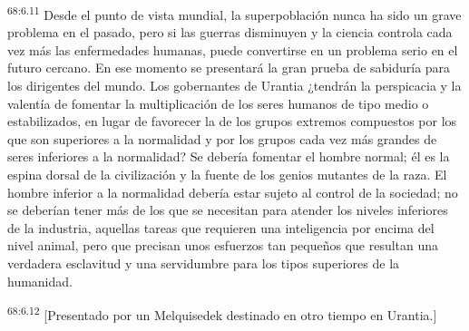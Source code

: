 \par
\textsuperscript{68:6.11} Desde el punto de vista mundial, la superpoblación nunca ha sido un grave problema en el pasado, pero si las guerras disminuyen y la ciencia controla cada vez más las enfermedades humanas, puede convertirse en un problema serio en el futuro cercano. En ese momento se presentará la gran prueba de sabiduría para los dirigentes del mundo. Los gobernantes de Urantia ¿tendrán la perspicacia y la valentía de fomentar la multiplicación de los seres humanos de tipo medio o estabilizados, en lugar de favorecer la de los grupos extremos compuestos por los que son superiores a la normalidad y por los grupos cada vez más grandes de seres inferiores a la normalidad? Se debería fomentar el hombre normal; él es la espina dorsal de la civilización y la fuente de los genios mutantes de la raza. El hombre inferior a la normalidad debería estar sujeto al control de la sociedad; no se deberían tener más de los que se necesitan para atender los niveles inferiores de la industria, aquellas tareas que requieren una inteligencia por encima del nivel animal, pero que precisan unos esfuerzos tan pequeños que resultan una verdadera esclavitud y una servidumbre para los tipos superiores de la humanidad.

\par
\textsuperscript{68:6.12} [Presentado por un Melquisedek destinado en otro tiempo en Urantia.]